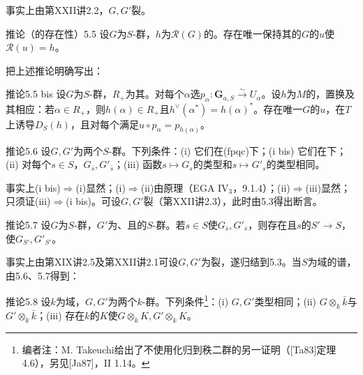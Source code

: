 事实上由第XXII讲2.2，$G,G'$裂。
\begin{SGAresult}{推论（的存在性）}{5.5}
设$G$为$S$-群，$h$为$\mathcal R(G)$的。存在唯一保持其的$G$的$u$使$\mathcal R(u)=h$。
\end{SGAresult}
把上述推论明确写出：
\begin{SGAresult}{推论}{5.5 bis}
设$G$为$S$-群，$R_+$为其。对每个$\alpha$选$p_\alpha:\mathbf G_{a,S}\xrightarrow\sim U_\alpha$。设$h$为$M$的，置换及其相应：若$\alpha\in R_+$，则$h(\alpha)\in R_+$且$h^\vee(\alpha^*)=h(\alpha)^*$。存在唯一$G$的$u$，在$T$上诱导$D_S(h)$，且对每个满足$u\circ p_\alpha=p_{h(\alpha)}$。
\end{SGAresult}
\begin{SGAresult}{推论}{5.6}
设$G,G'$为两个$S$-群。下列条件：(i) 它们在(fpqc)下；(i bis) 它们在下；
(ii) 对每个$s\in S$，$G_{\bar s},G'_{\bar s}$；(iii) 函数$s\mapsto G_s$的类型和$s\mapsto G'_s$的类型相同。
\end{SGAresult}
事实上(i bis)$\Rightarrow$(i)显然；(i)$\Rightarrow$(ii)由原理（EGA IV$_3$，9.1.4）；(ii)$\Rightarrow$(iii)显然；只须证(iii)$\Rightarrow$(i bis)。可设$G,G'$裂（第XXII讲2.3），此时由5.3得出断言。
\begin{SGAresult}{推论}{5.7}
设$G$为$S$-群，$G'$为、且的$S$-群。若$s\in S$使$G_{\bar s},G'_{\bar s}$，则存在且$s$的$S'\to S$，使$G_{S'},G'_{S'}$。
\end{SGAresult}
事实上由第XIX讲2.5及第XXII讲2.1可设$G,G'$为裂，遂归结到5.3。当$S$为域的谱，由5.6、5.7得到：
\begin{SGAresult}{推论}{5.8}
设$k$为域，$G,G'$为两个$k$-群。下列条件\footnote{编者注：M. Takeuchi给出了不使用化归到秩二群的另一证明（[Ta83]定理4.6），另见[Ja87]，II 1.14。}：(i) $G,G'$类型相同；(ii) $G\otimes_k\bar k$与$G'\otimes_k\bar k$；(iii) 存在$k$的$K$使$G\otimes_k K,G'\otimes_k K$。
\end{SGAresult}
